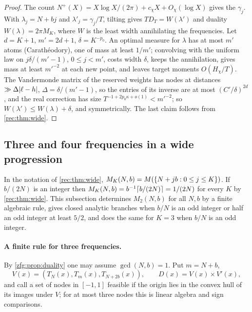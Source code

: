 \begin{proof}
The count $N^+(X)=X\log X/(2\pi)+c_\chi X+O_\chi(\log X)$ \cite{Selberg1992Old,FordSoundararajanZaharescu2009Distribution} gives the
$\gamma_j$. With $\lambda_j=N+bj$ and $\lambda'_j=\gamma_j/T$, tilting gives $TD_T=W(\lambda')$ and duality $W(\lambda)=2\pi M_K$, where $W$ is the least
width annihilating the frequencies. Let $d=K+1$, $m'=2d+1$, $\delta=K^{-p_0}$. An optimal measure for $\lambda$ has at most $m'$
atoms (Carath\'eodory), one of mass at least $1/m'$; convolving with the uniform law on $j\delta/(m'-1)$, $0\le j<m'$,
costs width $\delta$, keeps the annihilation, gives mass at least $m'^{-2}$ at each new point, and leaves target
moments $O(H_\chi/T)$. The Vandermonde matrix of the reserved weights has nodes at distances $\gg\Delta\lvert\ell-h\rvert$,
$\Delta=\delta/(m'-1)$, so the entries of its inverse are at most $(C'/\delta)^{2d}$, and the real correction has size
$T^{-1+2p_0\kappa+o(1)}<m'^{-2}$; so $W(\lambda')\le W(\lambda)+\delta$, and symmetrically. The last claim follows from \cref{rec:thm:wide}.
\end{proof}




\subsection{Three and four frequencies in a wide progression}\label{zfg:sec:prog}

In the notation of \cref{rec:thm:wide}, $M_K(N,b)=M(\{N+jb:0\le j\le K\})$. If $b/(2N)$ is an integer then
$M_K(N,b)=b^{-1}\lceil b/(2N)\rceil=1/(2N)$ for every $K$ by \cref{rec:thm:wide}. This subsection determines $M_2(N,b)$ for all $N,b$ by
a finite algebraic rule, gives closed analytic branches when $b/N$ is an odd integer or half an odd integer at
least $5/2$, and does the same for $K=3$ when $b/N$ is an odd integer.

\paragraph{A finite rule for three frequencies.}
By \cref{zfg:prop:duality} one may assume $\gcd(N,b)=1$. Put $m=N+b$,
\[
 V(x)=(T_N(x),T_m(x),T_{N+2b}(x)),\qquad D(x)=V(x)\times V'(x),
\]
and call a set of nodes in $[-1,1]$ feasible if the origin lies in the convex hull of its images under $V$; for at
most three nodes this is linear algebra and sign comparisons.

